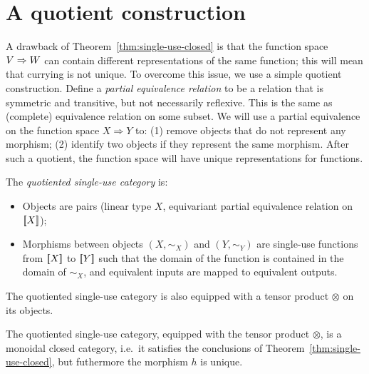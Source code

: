 
\section{A quotient construction}
\label{sec:quotient-category}
A drawback of Theorem~\ref{thm:single-use-closed} is that the function space $V \Rightarrow W$ can contain different representations of the same function; this will mean that currying is not unique. To overcome this issue, we use a simple quotient construction. 
Define a \emph{partial equivalence relation} to be a relation that is symmetric and transitive, but not necessarily reflexive.  This is the same as (complete) equivalence relation on some subset. We will use a partial equivalence on the function space $X \Rightarrow Y$ to: (1)
 remove objects that do not represent any morphism; (2) identify two objects if they represent the same morphism. After such a quotient, the function space will have unique representations for functions. 




\begin{definition}
    The \emph{quotiented single-use category} is: 
    \begin{itemize}
    \item Objects are pairs (linear type $X$, equivariant partial equivalence relation on $[{\kern-0.45ex}[X]{\kern-0.45ex}]$);
    \item Morphisms between objects $(X,\sim_X)$ and $(Y,\sim_Y)$ are single-use functions from $[{\kern-0.45ex}[X]{\kern-0.45ex}]$ to $[{\kern-0.45ex}[Y]{\kern-0.45ex}]$ such that the domain of the function is contained in the domain of $\sim_X$, and equivalent inputs are mapped to equivalent outputs.
    \end{itemize}
\end{definition}

The quotiented single-use category is also equipped with a tensor product $\otimes$ on its objects.
\begin{theorem}
    The quotiented single-use category, equipped with the tensor product $\otimes$, is a monoidal closed category, i.e.~it satisfies the conclusions of Theorem~\ref{thm:single-use-closed}, but futhermore the morphism $h$ is unique.
\end{theorem}

